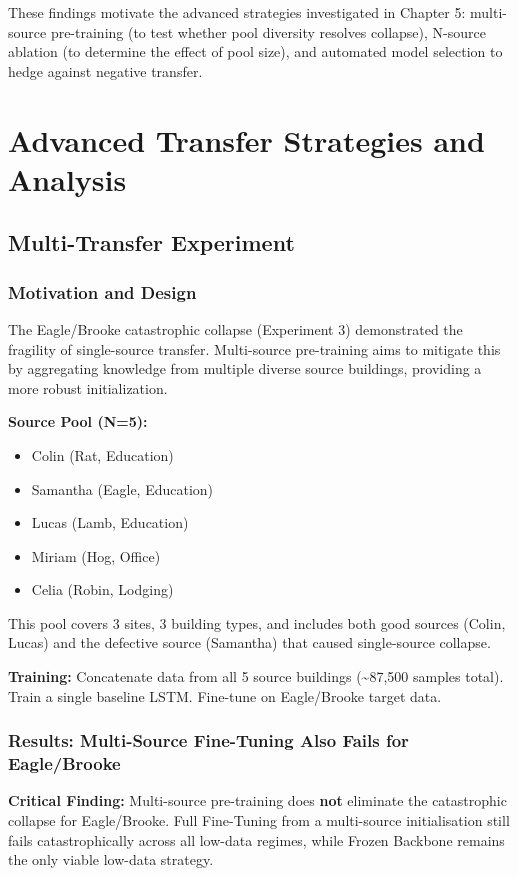 \documentclass[12pt,a4paper]{report}
\begin{document}
These findings motivate the advanced strategies investigated in Chapter 5: multi-source pre-training (to test whether pool diversity resolves collapse), N-source ablation (to determine the effect of pool size), and automated model selection to hedge against negative transfer.

\chapter{Advanced Transfer Strategies and Analysis}

\section{Multi-Transfer Experiment}

\subsection{Motivation and Design}

The Eagle/Brooke catastrophic collapse (Experiment 3) demonstrated the fragility of single-source transfer. Multi-source pre-training aims to mitigate this by aggregating knowledge from multiple diverse source buildings, providing a more robust initialization.

\textbf{Source Pool (N=5):}
\begin{itemize}
    \item Colin (Rat, Education)
    \item Samantha (Eagle, Education)
    \item Lucas (Lamb, Education)
    \item Miriam (Hog, Office)
    \item Celia (Robin, Lodging)
\end{itemize}

This pool covers 3 sites, 3 building types, and includes both good sources (Colin, Lucas) and the defective source (Samantha) that caused single-source collapse.

\textbf{Training:} Concatenate data from all 5 source buildings (\textasciitilde87,500 samples total). Train a single baseline LSTM. Fine-tune on Eagle/Brooke target data.

\subsection{Results: Multi-Source Fine-Tuning Also Fails for Eagle/Brooke}

\textbf{Critical Finding:} Multi-source pre-training does \textbf{not} eliminate the catastrophic collapse for Eagle/Brooke. Full Fine-Tuning from a multi-source initialisation still fails catastrophically across all low-data regimes, while Frozen Backbone remains the only viable low-data strategy.
\end{document}
